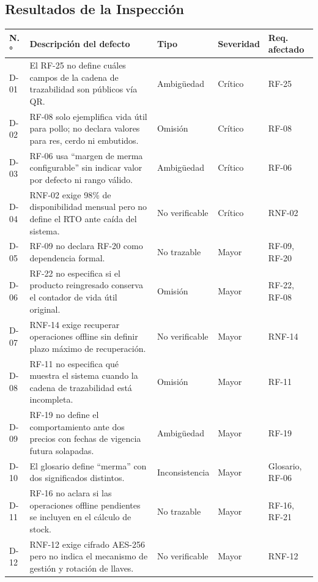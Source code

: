\documentclass[11pt,a4paper]{article}
\begin{document}
\subsection{Resultados de la Inspección}

\begin{longtable}{|p{0.8cm}|p{4.9cm}|p{2.2cm}|p{1.8cm}|p{2.2cm}|}
\hline
\textbf{N.°} & \textbf{Descripción del defecto} & \textbf{Tipo} & \textbf{Severidad} & \textbf{Req. afectado} \\
\hline
\endhead
D-01 & El RF-25 no define cuáles campos de la cadena de trazabilidad son públicos vía QR. & Ambigüedad & Crítico & RF-25 \\
\hline
D-02 & RF-08 solo ejemplifica vida útil para pollo; no declara valores para res, cerdo ni embutidos. & Omisión & Crítico & RF-08 \\
\hline
D-03 & RF-06 usa ``margen de merma configurable'' sin indicar valor por defecto ni rango válido. & Ambigüedad & Crítico & RF-06 \\
\hline
D-04 & RNF-02 exige 98\% de disponibilidad mensual pero no define el RTO ante caída del sistema. & No verificable & Crítico & RNF-02 \\
\hline
D-05 & RF-09 no declara RF-20 como dependencia formal. & No trazable & Mayor & RF-09, RF-20 \\
\hline
D-06 & RF-22 no especifica si el producto reingresado conserva el contador de vida útil original. & Omisión & Mayor & RF-22, RF-08 \\
\hline
D-07 & RNF-14 exige recuperar operaciones offline sin definir plazo máximo de recuperación. & No verificable & Mayor & RNF-14 \\
\hline
D-08 & RF-11 no especifica qué muestra el sistema cuando la cadena de trazabilidad está incompleta. & Omisión & Mayor & RF-11 \\
\hline
D-09 & RF-19 no define el comportamiento ante dos precios con fechas de vigencia futura solapadas. & Ambigüedad & Mayor & RF-19 \\
\hline
D-10 & El glosario define ``merma'' con dos significados distintos. & Inconsistencia & Mayor & Glosario, RF-06 \\
\hline
D-11 & RF-16 no aclara si las operaciones offline pendientes se incluyen en el cálculo de stock. & No trazable & Mayor & RF-16, RF-21 \\
\hline
D-12 & RNF-12 exige cifrado AES-256 pero no indica el mecanismo de gestión y rotación de llaves. & No verificable & Mayor & RNF-12 \\

\end{longtable}
\end{document}
